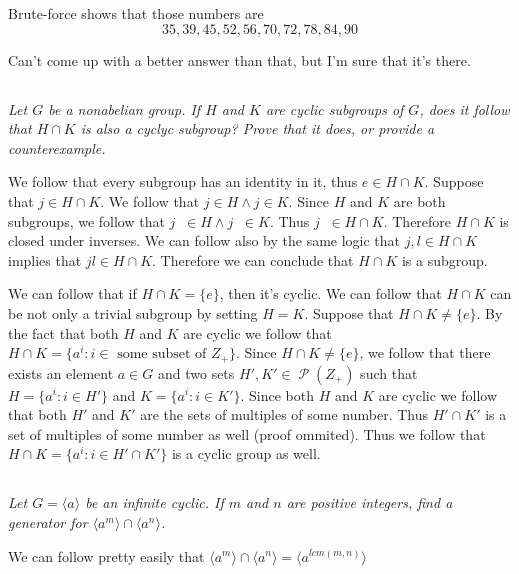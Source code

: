 \documentclass[11pt,oneside,titlepage]{book}
\DeclareMathOperator \pow {\mathcal {P}}
\DeclareMathOperator \inv {^{-1}}
\newcommand{\eangle}[1]{\langle #1 \rangle}
\newcommand{\set}[1]{\{ #1 \}}
\begin{document}
Brute-force shows that those numbers are
$$35, 39, 45, 52, 56, 70, 72, 78, 84, 90$$

Can't come up with a better answer than that, but I'm sure that it's there.

\subsection{}

\textit{Let $G$ be a nonabelian group. If $H$ and $K$ are cyclic subgroups of $G$,
  does it follow that $H \cap K$ is also a cyclyc subgroup? Prove that it does,
  or provide a counterexample.}

We follow that every subgroup has an identity in it, thus $e \in H \cap K$.
Suppose that $j \in H \cap K$. We follow that $j \in H \land j \in K$. Since $H$
and $K$ are both subgroups, we follow that $j \inv \in H \land j\inv \in K$. Thus
$j \inv \in H \cap K$. Therefore $H \cap K$ is closed under inverses.
We can follow also by the same logic that $j, l \in H \cap K$ implies that
$jl \in H \cap K$. Therefore we can conclude that $H \cap K$ is a subgroup.

We can follow that if $H \cap K = \set{e}$, then it's cyclic. We can follow that
$H \cap K$ can be not only a trivial subgroup by setting $H = K$. Suppose that
$H \cap K \neq \set{e}$. By the fact that both $H$ and $K$ are cyclic we follow that
$H \cap K = \set{a^i: i \in \text{ some subset of } Z_+}$.
Since $H \cap K \neq \set{e}$, we follow that there exists an element $a \in G$ and
two sets $H', K' \in \pow(Z_+)$ such that $H = \set{a^i: i \in H'}$ and
$K = \set{a^i: i \in K'}$. Since both $H$ and $K$ are cyclic we follow that
both $H'$ and $K'$ are the sets of multiples of some number. Thus
$H' \cap K'$ is a set of multiples of some number as well (proof ommited). Thus we
follow that $H \cap K = \set{a^i: i \in H' \cap K'}$ is a cyclic group as well.

\subsection{}

\textit{Let $G = \eangle{a}$ be an infinite cyclic. If $m$ and $n$ are positive integers,
find a generator for $\eangle{a^m} \cap \eangle{a^n}$.}

We can follow pretty easily that $\eangle{a^m} \cap \eangle{a^n} =
\eangle{a^{lcm(m, n)}}$

\subsection{}
\end{document}
